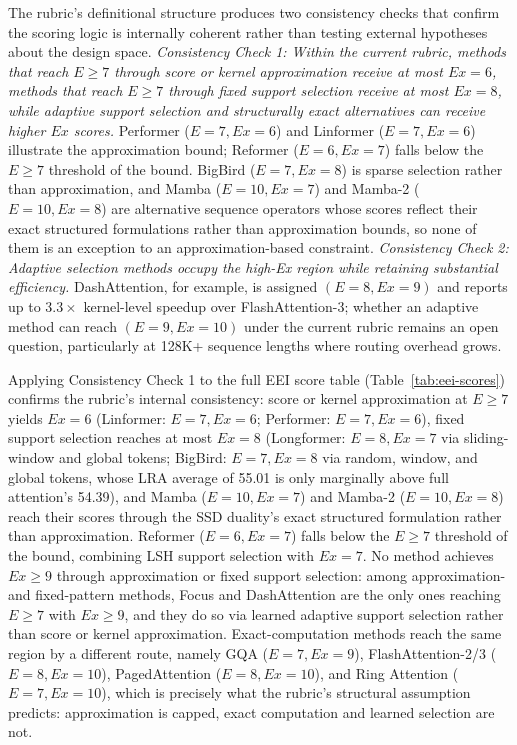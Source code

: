 \documentclass[10pt,twocolumn]{article}
\begin{document}
The rubric's definitional structure produces two consistency checks that confirm the scoring logic is internally coherent rather than testing external hypotheses about the design space. \textit{Consistency Check 1: Within the current rubric, methods that reach $E \geq 7$ through score or kernel approximation receive at most $Ex = 6$, methods that reach $E \geq 7$ through fixed support selection receive at most $Ex = 8$, while adaptive support selection and structurally exact alternatives can receive higher $Ex$ scores.} Performer ($E=7, Ex=6$) and Linformer ($E=7, Ex=6$) illustrate the approximation bound; Reformer ($E=6, Ex=7$) falls below the $E \geq 7$ threshold of the bound. BigBird ($E=7, Ex=8$) is sparse selection rather than approximation, and Mamba ($E=10, Ex=7$) and Mamba-2 ($E=10, Ex=8$) are alternative sequence operators whose scores reflect their exact structured formulations rather than approximation bounds, so none of them is an exception to an approximation-based constraint. \textit{Consistency Check 2: Adaptive selection methods occupy the high-Ex region while retaining substantial efficiency.} DashAttention, for example, is assigned $(E=8, Ex=9)$ and reports up to $3.3\times$ kernel-level speedup over FlashAttention-3; whether an adaptive method can reach $(E=9, Ex=10)$ under the current rubric remains an open question, particularly at 128K+ sequence lengths where routing overhead grows.

Applying Consistency Check 1 to the full EEI score table (Table~\ref{tab:eei-scores}) confirms the rubric's internal consistency: score or kernel approximation at $E \geq 7$ yields $Ex = 6$ (Linformer: $E=7, Ex=6$; Performer: $E=7, Ex=6$), fixed support selection reaches at most $Ex = 8$ (Longformer: $E=8, Ex=7$ via sliding-window and global tokens; BigBird: $E=7, Ex=8$ via random, window, and global tokens, whose LRA average of 55.01 is only marginally above full attention's 54.39), and Mamba ($E=10, Ex=7$) and Mamba-2 ($E=10, Ex=8$) reach their scores through the SSD duality's exact structured formulation rather than approximation. Reformer ($E=6, Ex=7$) falls below the $E \geq 7$ threshold of the bound, combining LSH support selection with $Ex = 7$. No method achieves $Ex \geq 9$ through approximation or fixed support selection: among approximation- and fixed-pattern methods, Focus and DashAttention are the only ones reaching $E \geq 7$ with $Ex \geq 9$, and they do so via learned adaptive support selection rather than score or kernel approximation. Exact-computation methods reach the same region by a different route, namely GQA ($E=7, Ex=9$), FlashAttention-2/3 ($E=8, Ex=10$), PagedAttention ($E=8, Ex=10$), and Ring Attention ($E=7, Ex=10$), which is precisely what the rubric's structural assumption predicts: approximation is capped, exact computation and learned selection are not.
\end{document}
